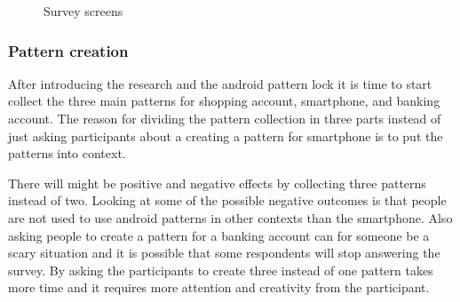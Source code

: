 \begin{figure}[H]
{          \label{fig:ALPintroduction}
        }
        \caption{Survey screens}
        \label{fig:introductionviews}
      \end{figure}

    \clearpage
    \subsubsection*{Pattern creation}
      After introducing the research and the android pattern lock it is time to start collect the three main patterns for shopping account, smartphone, and banking account.
      The reason for dividing the pattern collection in three parts instead of just asking participants about a creating a pattern for smartphone is to put the patterns into context. 

      There will might be positive and negative effects by collecting three patterns instead of two. Looking at some of the possible negative outcomes is that people are not used to use android patterns in other contexts than the smartphone. Also asking people to create a pattern for a banking account can for someone be a scary situation and it is possible that some respondents will stop answering the survey. By asking the participants to create three instead of one pattern takes more time and it requires more attention and creativity from the participant. 

